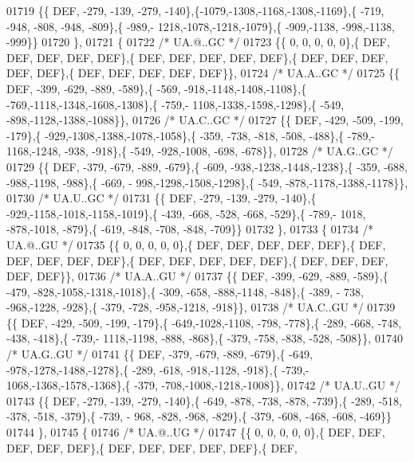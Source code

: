 \begin{DoxyCode}
01719 \{\{  DEF, -279, -139, -279, -140\},\{-1079,-1308,-1168,-1308,-1169\},\{ -719, -948, -808, -948, -809\},\{ -989,-
      1218,-1078,-1218,-1079\},\{ -909,-1138, -998,-1138, -999\}\}
01720 \},
01721 \{
01722 \textcolor{comment}{/* UA.@..GC */}
01723 \{\{    0,    0,    0,    0,    0\},\{  DEF,  DEF,  DEF,  DEF,  DEF\},\{  DEF,  DEF,  DEF,  DEF,  DEF\},\{  DEF,  
      DEF,  DEF,  DEF,  DEF\},\{  DEF,  DEF,  DEF,  DEF,  DEF\}\},
01724 \textcolor{comment}{/* UA.A..GC */}
01725 \{\{  DEF, -399, -629, -889, -589\},\{ -569, -918,-1148,-1408,-1108\},\{ -769,-1118,-1348,-1608,-1308\},\{ -759,-
      1108,-1338,-1598,-1298\},\{ -549, -898,-1128,-1388,-1088\}\},
01726 \textcolor{comment}{/* UA.C..GC */}
01727 \{\{  DEF, -429, -509, -199, -179\},\{ -929,-1308,-1388,-1078,-1058\},\{ -359, -738, -818, -508, -488\},\{ -789,-
      1168,-1248, -938, -918\},\{ -549, -928,-1008, -698, -678\}\},
01728 \textcolor{comment}{/* UA.G..GC */}
01729 \{\{  DEF, -379, -679, -889, -679\},\{ -609, -938,-1238,-1448,-1238\},\{ -359, -688, -988,-1198, -988\},\{ -669, -
      998,-1298,-1508,-1298\},\{ -549, -878,-1178,-1388,-1178\}\},
01730 \textcolor{comment}{/* UA.U..GC */}
01731 \{\{  DEF, -279, -139, -279, -140\},\{ -929,-1158,-1018,-1158,-1019\},\{ -439, -668, -528, -668, -529\},\{ -789,-
      1018, -878,-1018, -879\},\{ -619, -848, -708, -848, -709\}\}
01732 \},
01733 \{
01734 \textcolor{comment}{/* UA.@..GU */}
01735 \{\{    0,    0,    0,    0,    0\},\{  DEF,  DEF,  DEF,  DEF,  DEF\},\{  DEF,  DEF,  DEF,  DEF,  DEF\},\{  DEF,  
      DEF,  DEF,  DEF,  DEF\},\{  DEF,  DEF,  DEF,  DEF,  DEF\}\},
01736 \textcolor{comment}{/* UA.A..GU */}
01737 \{\{  DEF, -399, -629, -889, -589\},\{ -479, -828,-1058,-1318,-1018\},\{ -309, -658, -888,-1148, -848\},\{ -389, -
      738, -968,-1228, -928\},\{ -379, -728, -958,-1218, -918\}\},
01738 \textcolor{comment}{/* UA.C..GU */}
01739 \{\{  DEF, -429, -509, -199, -179\},\{ -649,-1028,-1108, -798, -778\},\{ -289, -668, -748, -438, -418\},\{ -739,-
      1118,-1198, -888, -868\},\{ -379, -758, -838, -528, -508\}\},
01740 \textcolor{comment}{/* UA.G..GU */}
01741 \{\{  DEF, -379, -679, -889, -679\},\{ -649, -978,-1278,-1488,-1278\},\{ -289, -618, -918,-1128, -918\},\{ -739,-
      1068,-1368,-1578,-1368\},\{ -379, -708,-1008,-1218,-1008\}\},
01742 \textcolor{comment}{/* UA.U..GU */}
01743 \{\{  DEF, -279, -139, -279, -140\},\{ -649, -878, -738, -878, -739\},\{ -289, -518, -378, -518, -379\},\{ -739, -
      968, -828, -968, -829\},\{ -379, -608, -468, -608, -469\}\}
01744 \},
01745 \{
01746 \textcolor{comment}{/* UA.@..UG */}
01747 \{\{    0,    0,    0,    0,    0\},\{  DEF,  DEF,  DEF,  DEF,  DEF\},\{  DEF,  DEF,  DEF,  DEF,  DEF\},\{  DEF,  

\end{DoxyCode}
